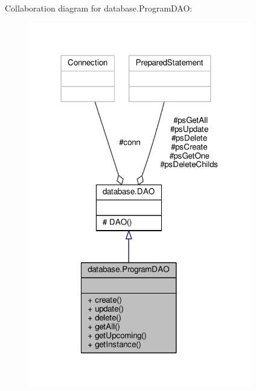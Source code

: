 Collaboration diagram for database.\-Program\-D\-A\-O\-:\nopagebreak
\begin{figure}[H]
\begin{center}
\leavevmode
\includegraphics[width=276pt]{classdatabase_1_1ProgramDAO__coll__graph}
\end{center}
\end{figure}
